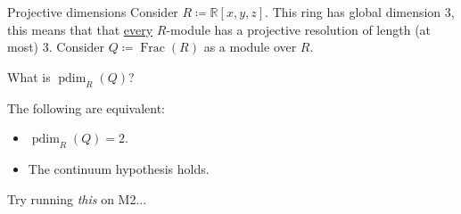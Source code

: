 \documentclass{beamer}
\DeclareMathOperator{\Frac}{Frac}
\DeclareMathOperator{\pdim}{pdim}
\begin{document}
	\begin{frame}{Projective dimensions}
		Consider $R \coloneqq \mathbb{R}[x, y, z]$. \pause This ring has global dimension $3$, \pause this means that that \underline{every} $R$-module has a projective resolution of length (at most) $3$. \pause Consider $Q \coloneqq \Frac(R)$ as a module over $R$. \pause

		What is $\pdim_{R}(Q)$? \pause %

		\begin{theorem}
			The following are equivalent: \pause
			\begin{itemize}[<+->]
				\item $\pdim_{R}(Q) = 2$.
				\item The continuum hypothesis holds. 
			\end{itemize}
		\end{theorem}

		\phantom{h} \hfill {\tiny Try running \emph{this} on M2...}
	\end{frame}
\end{document}
